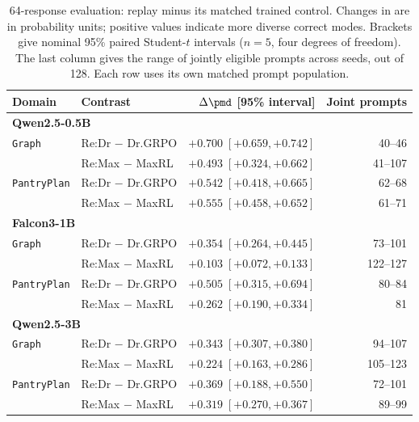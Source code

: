 \begin{table}[t]
\centering
\small
\setlength{\tabcolsep}{4pt}
\caption{64-response evaluation: replay minus its matched trained control. Changes in \pmd{} are in probability units; positive values indicate more diverse correct modes. Brackets give nominal 95\% paired Student-$t$ intervals ($n=5$, four degrees of freedom). The last column gives the range of jointly eligible prompts across seeds, out of 128. Each row uses its own matched prompt population.}
\label{tab:fresh-concentration-replay}
\begin{tabular}{llrr}
\toprule
Domain & Contrast & $\Delta\pmd$ [95\% interval] & Joint prompts \\
\midrule
\multicolumn{4}{l}{\textbf{Qwen2.5-0.5B}} \\
\texttt{Graph} & Re:Dr $-$ Dr.GRPO & $+0.700\;[+0.659, +0.742]$ & 40--46 \\
 & Re:Max $-$ MaxRL & $+0.493\;[+0.324, +0.662]$ & 41--107 \\
\texttt{PantryPlan} & Re:Dr $-$ Dr.GRPO & $+0.542\;[+0.418, +0.665]$ & 62--68 \\
 & Re:Max $-$ MaxRL & $+0.555\;[+0.458, +0.652]$ & 61--71 \\
\midrule
\multicolumn{4}{l}{\textbf{Falcon3-1B}} \\
\texttt{Graph} & Re:Dr $-$ Dr.GRPO & $+0.354\;[+0.264, +0.445]$ & 73--101 \\
 & Re:Max $-$ MaxRL & $+0.103\;[+0.072, +0.133]$ & 122--127 \\
\texttt{PantryPlan} & Re:Dr $-$ Dr.GRPO & $+0.505\;[+0.315, +0.694]$ & 80--84 \\
 & Re:Max $-$ MaxRL & $+0.262\;[+0.190, +0.334]$ & 81 \\
\midrule
\multicolumn{4}{l}{\textbf{Qwen2.5-3B}} \\
\texttt{Graph} & Re:Dr $-$ Dr.GRPO & $+0.343\;[+0.307, +0.380]$ & 94--107 \\
 & Re:Max $-$ MaxRL & $+0.224\;[+0.163, +0.286]$ & 105--123 \\
\texttt{PantryPlan} & Re:Dr $-$ Dr.GRPO & $+0.369\;[+0.188, +0.550]$ & 72--101 \\
 & Re:Max $-$ MaxRL & $+0.319\;[+0.270, +0.367]$ & 89--99 \\
\bottomrule
\end{tabular}
\end{table}
